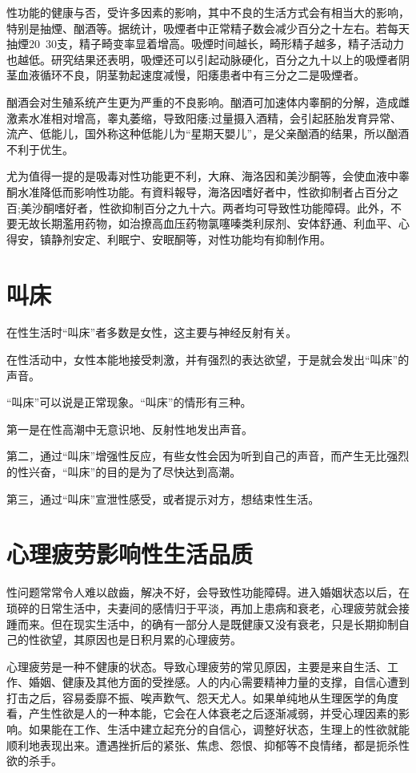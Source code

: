 \documentclass[12pt,UTF8]{ctexbook}
\begin{document}
性功能的健康与否，受许多因素的影响，其中不良的生活方式会有相当大的影响，特别是抽煙、酗酒等。据统计，吸煙者中正常精子数会减少百分之十左右。若每天抽煙20~30支，精子畸变率显着增高。吸煙时间越长，畸形精子越多，精子活动力也越低。研究结果还表明，吸煙还可以引起动脉硬化，百分之九十以上的吸煙者阴茎血液循环不良，阴茎勃起速度减慢，阳痿患者中有三分之二是吸煙者。

酗酒会对生殖系统产生更为严重的不良影响。酗酒可加速体内睾酮的分解，造成雌激素水准相对增高，睾丸萎缩，导致阳痿;过量摄入酒精，会引起胚胎发育异常、流产、低能儿，国外称这种低能儿为“星期天嬰儿”，是父亲酗酒的结果，所以酗酒不利于优生。

尤为值得一提的是吸毒对性功能更不利，大麻、海洛因和美沙酮等，会使血液中睾酮水准降低而影响性功能。有資料報导，海洛因嗜好者中，性欲抑制者占百分之百;美沙酮嗜好者，性欲抑制百分之九十六。两者均可导致性功能障碍。此外，不要无故长期濫用药物，如治撩高血压药物氯噻嗪类利尿剂、安体舒通、利血平、心得安，镇静剂安定、利眠宁、安眠酮等，对性功能均有抑制作用。

\section{叫床}

在性生活时“叫床”者多数是女性，这主要与神经反射有关。

在性活动中，女性本能地接受刺激，并有强烈的表达欲望，于是就会发出“叫床”的声音。

“叫床”可以说是正常现象。“叫床”的情形有三种。

第一是在性高潮中无意识地、反射性地发出声音。

第二，通过“叫床”增强性反应，有些女性会因为听到自己的声音，而产生无比强烈的性兴奋，“叫床”的目的是为了尽快达到高潮。

第三，通过“叫床”宣泄性感受，或者提示对方，想结束性生活。

\section{心理疲劳影响性生活品质}

性问题常常令人难以啟齒，解决不好，会导致性功能障碍。进入婚姻状态以后，在琐碎的日常生活中，夫妻间的感情归于平淡，再加上患病和衰老，心理疲劳就会接踵而来。但在现实生活中，的确有一部分人是既健康又没有衰老，只是长期抑制自己的性欲望，其原因也是日积月累的心理疲劳。

心理疲劳是一种不健康的状态。导致心理疲劳的常见原因，主要是来自生活、工作、婚姻、健康及其他方面的受挫感。人的内心需要精神力量的支撑，自信心遭到打击之后，容易委靡不振、唉声歎气、怨天尤人。如果单纯地从生理医学的角度看，产生性欲是人的一种本能，它会在人体衰老之后逐渐减弱，并受心理因素的影响。如果能在工作、生活中建立起充分的自信心，调整好状态，生理上的性欲就能顺利地表现出来。遭遇挫折后的紧张、焦虑、怨恨、抑郁等不良情绪，都是扼杀性欲的杀手。
\end{document}
